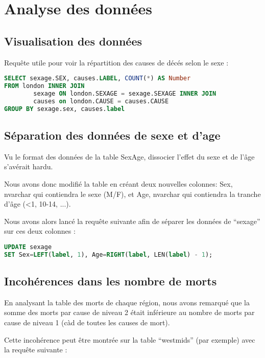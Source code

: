 \chapter{Analyse des données}

\section{Visualisation des données}

Requête utile pour voir la répartition des causes de décés selon le sexe :

\begin{lstlisting}[frame=single, language=SQL]
SELECT sexage.SEX, causes.LABEL, COUNT(*) AS Number
FROM london INNER JOIN
        sexage ON london.SEXAGE = sexage.SEXAGE INNER JOIN
        causes on london.CAUSE = causes.CAUSE
GROUP BY sexage.sex, causes.label
\end{lstlisting}

\section{Séparation des données de sexe et d'age}

    Vu le format des données de la table SexAge, dissocier l'effet du sexe et de l'âge s'avérait hardu.

    Nous avons donc modifié la table en créant deux nouvelles colonnes: Sex, nvarchar qui contiendra le sexe (M/F), et Age,
    nvarchar qui contiendra la tranche d'âge (<1, 10-14, ...).

    Nous avons alors lancé la requête suivante afin de séparer les données de ``sexage'' sur ces deux colonnes :

    \begin{lstlisting}[frame=single, language=SQL]
UPDATE sexage
SET Sex=LEFT(label, 1), Age=RIGHT(label, LEN(label) - 1);
    \end{lstlisting}

\section{Incohérences dans les nombre de morts}

    En analysant la table des morts de chaque région, nous avons remarqué que la somme des morts par cause de niveau 2 était
    inférieure au nombre de morts par cause de niveau 1 (càd de toutes les causes de mort).

    Cette incohérence peut être montrée sur la table ``westmids'' (par exemple) avec la requête suivante :

